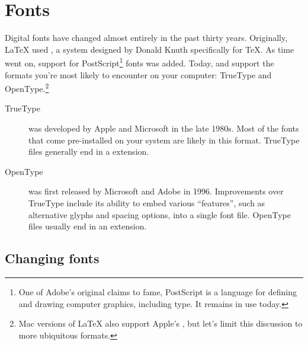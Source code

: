 \chapter{Fonts}
\label{fonts}

Digital fonts have changed almost entirely in the past thirty years.
Originally, \LaTeX{} used \MF,
a system designed by Donald Knuth specifically for \TeX{}.
As time went on, support for PostScript\footnote{One of
Adobe's original claims to fame,
PostScript is a language for defining and drawing computer graphics,
including type. It remains in use today.} fonts was added.
Today, \LuaLaTeX{} and \XeLaTeX{} support the formats you're
most likely to encounter on your computer:
TrueType and OpenType.\punckern\footnote{Mac versions of \LaTeX{} also support
Apple's , but let's limit this discussion to
more ubiquitous formats.}

\begin{description}
\item[TrueType] was developed by Apple and Microsoft in the late 1980s.
    Most of the fonts that come pre-installed on your system are likely
    in this format.
    TrueType files generally end in a  extension.
\item[OpenType] was first released by Microsoft and Adobe in 1996.
    Improvements over TrueType include its ability to embed
    various ``features''\quotekern, such as alternative glyphs
    and spacing options, into a single font file.
    OpenType files usually end in an  extension.
\end{description}

\section{Changing fonts}

